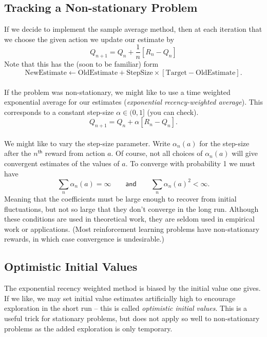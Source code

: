 \subsection{Tracking a Non-stationary Problem}
If we decide to implement the sample average method, then at each iteration that we choose the given action we update our estimate by
\begin{equation}
    Q_{n+1} = Q_n + \frac1n [R_n - Q_n]
\end{equation}
Note that this has the (soon to be familiar) form
\begin{equation}
    \mathrm{NewEstimate} \gets \mathrm{OldEstimate} + \mathrm{StepSize}\times[\mathrm{Target} - \mathrm{OldEstimate}].
\end{equation}
\mbox{}\\
If the problem was non-stationary, we might like to use a time weighted exponential average for our estimates (\emph{exponential recency-weighted average}). This corresponds to a constant step-size $\alpha \in (0, 1]$ (you can check).
\begin{equation}
    Q_{n+1} = Q_n + \alpha [R_n - Q_n].
\end{equation}
\mbox{}\\
We might like to vary the step-size parameter. Write $\alpha_n(a)$ for the step-size after the $n^{\mathsf{th}}$ reward from action $a$. Of course, not all choices of $\alpha_n(a)$ will give convergent estimates of the values of $a$. To converge with probability 1 we must have
\begin{equation}
    \sum_n \alpha_n(a) = \infty \quad\quad \mathsf{and} \quad\quad  \sum_n \alpha_n(a)^2 < \infty.
\end{equation}
Meaning that the coefficients must be large enough to recover from initial fluctuations, but not so large that they don't converge in the long run. Although these conditions are used in theoretical work, they are seldom used in empirical work or applications. (Most reinforcement learning problems have non-stationary rewards, in which case convergence is undesirable.)

\subsection{Optimistic Initial Values}
The exponential recency weighted method is biased by the initial value one gives. If we like, we may set initial value estimates artificially high to encourage exploration in the short run -- this is called \emph{optimistic initial values}. This is a useful trick for stationary problems, but does not apply so well to non-stationary problems as the added exploration is only temporary.


